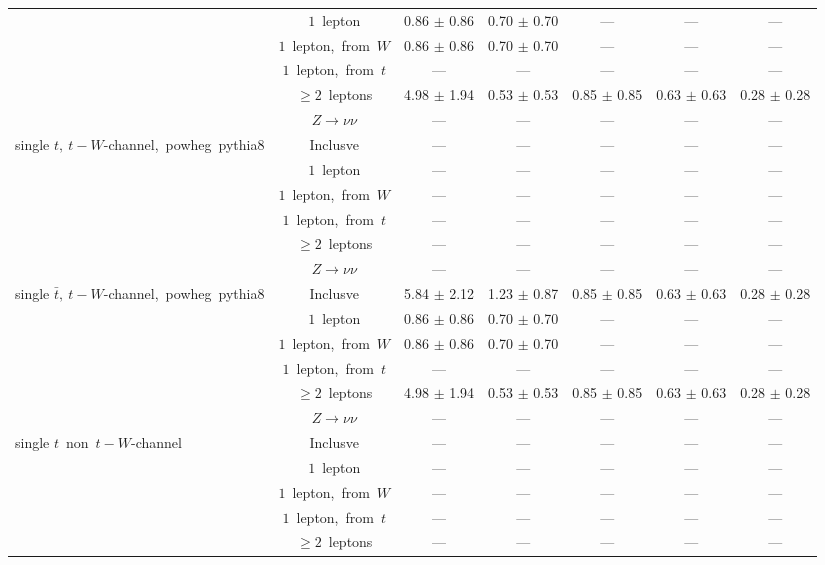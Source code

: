 \documentclass{article}
\begin{document}
\begin{longtable}{|l|c|c|c|c|c|c|}
 & $1$~lepton  & 0.86 $\pm$ 0.86  & 0.70 $\pm$ 0.70  & ---  & ---  & --- \\* 
 & $1$~lepton,~from~$W$  & 0.86 $\pm$ 0.86  & 0.70 $\pm$ 0.70  & ---  & ---  & --- \\* 
 & $1$~lepton,~from~$t$  & ---  & ---  & ---  & ---  & --- \\* 
 & $\ge2$~leptons  & 4.98 $\pm$ 1.94  & 0.53 $\pm$ 0.53  & 0.85 $\pm$ 0.85  & 0.63 $\pm$ 0.63  & 0.28 $\pm$ 0.28 \\* 
 & $Z\rightarrow\nu\nu$  & ---  & ---  & ---  & ---  & --- \\* 
\hline 
\multirow{6}{*}{single $t,~t-W$-channel,~powheg~pythia8} & Inclusve  & ---  & ---  & ---  & ---  & --- \\* 
 & $1$~lepton  & ---  & ---  & ---  & ---  & --- \\* 
 & $1$~lepton,~from~$W$  & ---  & ---  & ---  & ---  & --- \\* 
 & $1$~lepton,~from~$t$  & ---  & ---  & ---  & ---  & --- \\* 
 & $\ge2$~leptons  & ---  & ---  & ---  & ---  & --- \\* 
 & $Z\rightarrow\nu\nu$  & ---  & ---  & ---  & ---  & --- \\* 
\hline 
\multirow{6}{*}{single $\bar{t},~t-W$-channel,~powheg~pythia8} & Inclusve  & 5.84 $\pm$ 2.12  & 1.23 $\pm$ 0.87  & 0.85 $\pm$ 0.85  & 0.63 $\pm$ 0.63  & 0.28 $\pm$ 0.28 \\* 
 & $1$~lepton  & 0.86 $\pm$ 0.86  & 0.70 $\pm$ 0.70  & ---  & ---  & --- \\* 
 & $1$~lepton,~from~$W$  & 0.86 $\pm$ 0.86  & 0.70 $\pm$ 0.70  & ---  & ---  & --- \\* 
 & $1$~lepton,~from~$t$  & ---  & ---  & ---  & ---  & --- \\* 
 & $\ge2$~leptons  & 4.98 $\pm$ 1.94  & 0.53 $\pm$ 0.53  & 0.85 $\pm$ 0.85  & 0.63 $\pm$ 0.63  & 0.28 $\pm$ 0.28 \\* 
 & $Z\rightarrow\nu\nu$  & ---  & ---  & ---  & ---  & --- \\* 
\hline 
\multirow{6}{*}{single $t$~non~$t-W$-channel} & Inclusve  & ---  & ---  & ---  & ---  & --- \\* 
 & $1$~lepton  & ---  & ---  & ---  & ---  & --- \\* 
 & $1$~lepton,~from~$W$  & ---  & ---  & ---  & ---  & --- \\* 
 & $1$~lepton,~from~$t$  & ---  & ---  & ---  & ---  & --- \\* 
 & $\ge2$~leptons  & ---  & ---  & ---  & ---  & --- \\* 

\end{longtable}
\end{document}
